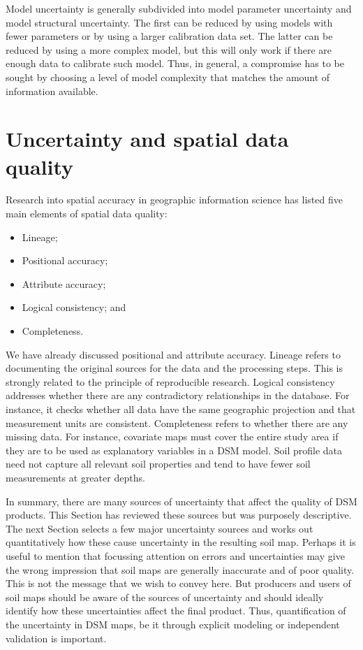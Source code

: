 \documentclass[10pt,b5paper,]{book}
\providecommand{\tightlist}{%
  \setlength{\itemsep}{0pt}\setlength{\parskip}{0pt}}
\theoremstyle{definition}
\theoremstyle{definition}
\theoremstyle{definition}
\theoremstyle{remark}
\begin{document}
Model uncertainty is generally subdivided into model parameter
uncertainty and model structural uncertainty. The first can be reduced
by using models with fewer parameters or by using a larger calibration
data set. The latter can be reduced by using a more complex model, but
this will only work if there are enough data to calibrate such model.
Thus, in general, a compromise has to be sought by choosing a level of
model complexity that matches the amount of information available.

\hypertarget{uncertainty-and-spatial-data-quality}{%
\section{Uncertainty and spatial data
quality}\label{uncertainty-and-spatial-data-quality}}

Research into spatial accuracy in geographic information science has
listed five main elements of spatial data quality:

\begin{itemize}
\tightlist
\item
  Lineage;
\item
  Positional accuracy;
\item
  Attribute accuracy;
\item
  Logical consistency; and
\item
  Completeness.
\end{itemize}

We have already discussed positional and attribute accuracy. Lineage
refers to documenting the original sources for the data and the
processing steps. This is strongly related to the principle of
reproducible research. Logical consistency addresses whether there are
any contradictory relationships in the database. For instance, it checks
whether all data have the same geographic projection and that
measurement units are consistent. Completeness refers to whether there
are any missing data. For instance, covariate maps must cover the entire
study area if they are to be used as explanatory variables in a DSM
model. Soil profile data need not capture all relevant soil properties
and tend to have fewer soil measurements at greater depths.

In summary, there are many sources of uncertainty that affect the
quality of DSM products. This Section has reviewed these sources but was
purposely descriptive. The next Section selects a few major uncertainty
sources and works out quantitatively how these cause uncertainty in the
resulting soil map. Perhaps it is useful to mention that focussing
attention on errors and uncertainties may give the wrong impression that
soil maps are generally inaccurate and of poor quality. This is not the
message that we wish to convey here. But producers and users of soil
maps should be aware of the sources of uncertainty and should ideally
identify how these uncertainties affect the final product. Thus,
quantification of the uncertainty in DSM maps, be it through explicit
modeling or independent validation is important.
\end{document}
